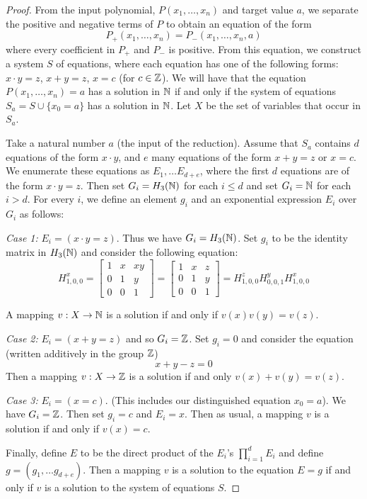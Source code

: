 \documentclass[11pt, titlepage]{article}
\begin{document}
\begin{proof}
  From the input polynomial, $P(x_1, \ldots, x_n)$ and target value
  $a$, we separate the positive and negative terms of $P$ to obtain an
  equation of the form
  \[
    P_+(x_1, \ldots, x_n) = P_-(x_1, \ldots, x_n, a)
  \]
  where every coefficient in $P_+$ and $P_-$ is positive. From this
  equation, we construct a system $S$ of equations, where each
  equation has one of the following forms: $x\cdot y = z$,
  $x+y = z$, $x = c$ (for $c \in \mathbb{Z}$).  We will have that the equation
  $P(x_1,\ldots, x_n) = a$ has a solution in $\mathbb{N}$ if and only if the
  system of equations $S_a = S \cup \{x_0 = a\}$ has a solution in
  $\mathbb{N}$. Let $X$ be the set of variables that occur in $S_a$.

  Take a natural number $a$ (the input of the reduction). Assume that
  $S_a$ contains $d$ equations of the form $x\cdot y$, and $e$ many
  equations of the form $x+y = z$ or $x = c$. We enumerate these
  equations as $E_1, \ldots E_{d+e}$, where the first $d$ equations
  are of the form $x\cdot y = z$. Then set $G_i = H_3(\mathbb{N})$ for each
  $i \leq d$ and set $G_i = \mathbb{N}$ for each $i > d$. For every $i$, we
  define an element $g_i$ and an exponential expression $E_i$ over
  $G_i$ as follows:

  \textit{Case 1:} $E_i = (x \cdot y = z)$. Thus we have
  $G_i = H_3(\mathbb{N})$. Set $g_i$ to be the identity matrix in $H_3(\mathbb{N})$
  and consider the following equation:
  \[
    H^x_{1,0,0} =
    \begin{bmatrix}
      1 & x & xy \\
      0 & 1 & y \\
      0 & 0 & 1
    \end{bmatrix} = 
    \begin{bmatrix}
      1 & x & z \\
      0 & 1 & y \\
      0 & 0 & 1
    \end{bmatrix} = 
    H^z_{1,0,0} H^y_{0,0,1} H^x_{1,0,0}
  \]

  A mapping $v : X \rightarrow \mathbb{N}$ is a solution if and only if
  $v(x)v(y) = v(z)$.

  \textit{Case 2:} $E_i = (x+y=z)$ and so $G_i= \mathbb{Z}$. Set $g_i = 0$ and
  consider the equation (written additively in the group $\mathbb{Z}$)
  \[
    x+y-z = 0
  \]
  Then a mapping $v : X \rightarrow \mathbb{Z}$ is a solution if
  and only $v(x) + v(y) = v(z)$.

  \textit{Case 3:} $E_i = (x = c)$. (This includes our distinguished
  equation $x_0 = a$). We have $G_i = \mathbb{Z}$. Then set $g_i = c$ and
  $E_i = x$. Then as usual, a mapping $v$ is a solution if and only if
  $v(x) = c$.

  Finally, define $E$ to be the direct product of the $E_i$'s
  $\prod_{i=1}^d E_i$ and define $g = (g_1, \ldots g_{d+e})$. Then a
  mapping $v$ is a solution to the equation $E = g$ if and only if $v$
  is a solution to the system of equations $S$.
\end{proof} %
\end{document}
